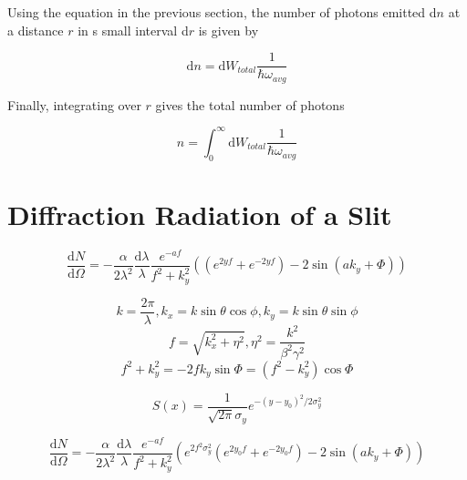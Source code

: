 \documentclass[12pt]{article}
\begin{document}
Using the equation in the previous section, the number of photons emitted d$n$ at a distance $r$ in s small interval d$r$ is given by

\begin{equation}
\mathrm{d}n=\mathrm{d} W_{total} \frac{1}{\hbar \omega_{avg}}
\end{equation}

Finally, integrating over $r$ gives the total number of photons

\begin{equation}
n=\int_0^{\infty} \mathrm{d} W_{total} \frac{1}{\hbar \omega_{avg}}
\end{equation}

\section{Diffraction Radiation of a Slit}

\begin{equation}
\frac{\mathrm{d} N}{\mathrm{d} \Omega}=-\frac{\alpha}{2\lambda^2} \frac{\mathrm{d} \lambda}{\lambda} \frac{e^{-af}}{f^2+k_{y}^{2}} ((e^{2yf}+e^{-2yf})-2 \sin (ak_y+\Phi))
\end{equation}

\begin{equation}
k=\frac{2 \pi}{\lambda},
k_x=k \sin \theta \cos \phi,
k_y=k \sin \theta \sin \phi
\end{equation}
\begin{equation}
f=\sqrt{k_{x}^{2}+\eta^2},
\eta^2=\frac{k^2}{\beta^2 \gamma^2}
\end{equation}
\begin{equation}
f^2+k_{y}^{2}=-2fk_y \sin \Phi = (f^2-k_{y}^{2}) \cos \Phi
\end{equation}

\begin{equation}
S(x)=\frac{1}{\sqrt{2 \pi} \sigma_y} e^{-(y-y_0)^2/2 \sigma_{y}^{2}}
\end{equation}

\begin{equation}
\frac{\mathrm{d} N}{\mathrm{d} \Omega}=-\frac{\alpha}{2\lambda^2} \frac{\mathrm{d} \lambda}{\lambda} \frac{e^{-af}}{f^2+k_{y}^{2}} (e^{2 f^2 \sigma_{y}^{2}}(e^{2y_0 f}+e^{-2y_0 f})-2 \sin (ak_y+\Phi))
\end{equation}

\end{document}
